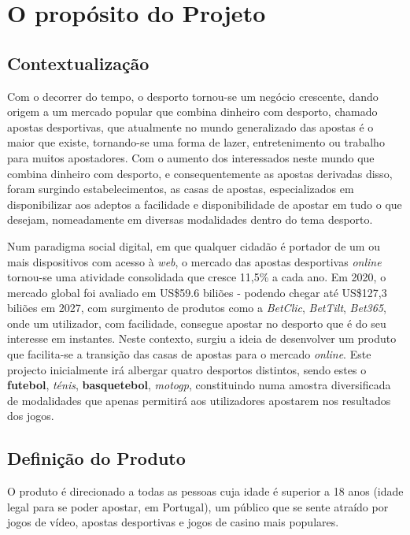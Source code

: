 \chapter{O propósito do Projeto}

\section{Contextualização}

Com o decorrer do tempo, o desporto tornou-se um negócio crescente, dando origem a um mercado popular que combina dinheiro com desporto, chamado apostas desportivas, que atualmente no mundo generalizado das apostas é o maior que existe, tornando-se uma forma de lazer, entretenimento ou trabalho para muitos apostadores.
Com o aumento dos interessados neste mundo que combina dinheiro com desporto, e consequentemente as apostas derivadas disso, foram surgindo estabelecimentos, as casas de apostas, especializados em disponibilizar aos adeptos a facilidade e disponibilidade de apostar em tudo o que desejam, nomeadamente em diversas modalidades dentro do tema desporto.

Num paradigma social digital, em que qualquer cidadão é portador de um ou mais dispositivos com acesso à \textit{web}, o mercado das apostas desportivas \textit{online} tornou-se uma atividade consolidada que cresce 11,5\% a cada ano. Em 2020, o mercado global foi avaliado em US\$59.6 biliões - podendo chegar até US\$127,3 biliões em 2027, com surgimento de produtos como a \textit{BetClic}, \textit{BetTilt}, \textit{Bet365}, onde um utilizador, com facilidade, consegue apostar no desporto que é do seu interesse em instantes.
Neste contexto, surgiu a ideia de desenvolver um produto que facilita-se a transição das casas de apostas para o mercado \textit{online}.
Este projecto inicialmente irá albergar quatro desportos distintos, sendo estes o \textbf{futebol}, \textit{ténis}, \textbf{basquetebol}, \textit{motogp}, constituindo numa amostra diversificada de modalidades que apenas permitirá aos utilizadores apostarem nos resultados dos jogos.

\section{Definição do Produto}
O produto é direcionado a todas as pessoas cuja idade é superior a 18 anos (idade legal para se poder apostar, em Portugal), um público que se sente atraído por jogos de vídeo, apostas desportivas e jogos de casino mais populares.

